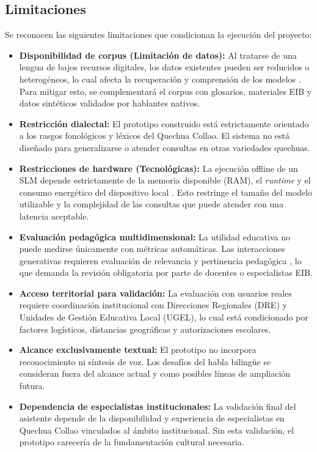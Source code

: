 \subsection{Limitaciones}
Se reconocen las siguientes limitaciones que condicionan la ejecución del proyecto:

\begin{itemize}
	\item \textbf{Disponibilidad de corpus (Limitación de datos):} Al tratarse de una lengua de bajos recursos digitales, los datos existentes pueden ser reducidos o heterogéneos, lo cual afecta la recuperación y comprensión de los modelos \citep{Court2024}. Para mitigar esto, se complementará el corpus con glosarios, materiales EIB y datos sintéticos validados por hablantes nativos.

	\item \textbf{Restricción dialectal:} El prototipo construido está estrictamente orientado a los rasgos fonológicos y léxicos del Quechua Collao. El sistema no está diseñado para generalizarse o atender consultas en otras variedades quechuas.

	\item \textbf{Restricciones de hardware (Tecnológicas):} La ejecución offline de un SLM depende estrictamente de la memoria disponible (RAM), el \textit{runtime} y el consumo energético del dispositivo local \citep{Xu2024}. Esto restringe el tamaño del modelo utilizable y la complejidad de las consultas que puede atender con una latencia aceptable.

	\item \textbf{Evaluación pedagógica multidimensional:} La utilidad educativa no puede medirse únicamente con métricas automáticas. Las interacciones generativas requieren evaluación de relevancia y pertinencia pedagógica \citep{Levonian2025}, lo que demanda la revisión obligatoria por parte de docentes o especialistas EIB.

	\item \textbf{Acceso territorial para validación:} La evaluación con usuarios reales requiere coordinación institucional con Direcciones Regionales (DRE) y Unidades de Gestión Educativa Local (UGEL), lo cual está condicionado por factores logísticos, distancias geográficas y autorizaciones escolares.

	\item \textbf{Alcance exclusivamente textual:} El prototipo no incorpora reconocimiento ni síntesis de voz. Los desafíos del habla bilingüe se consideran fuera del alcance actual y como posibles líneas de ampliación futura.

	\item \textbf{Dependencia de especialistas institucionales:} La validación final del asistente depende de la disponibilidad y experiencia de especialistas en Quechua Collao vinculados al ámbito institucional. Sin esta validación, el prototipo carecería de la fundamentación cultural necesaria.
\end{itemize}

